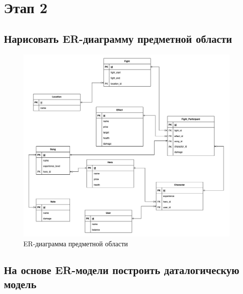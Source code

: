 \section*{Этап 2}


\subsection*{Нарисовать ER-диаграмму предметной области}


\begin{figure}[H]
	\begin{center}
		\includegraphics[scale=0.48]{images/ER.jpg}
		\caption{ER-диаграмма предметной области}
	\end{center}
\end{figure}

\subsection*{На основе ER-модели построить даталогическую модель}


